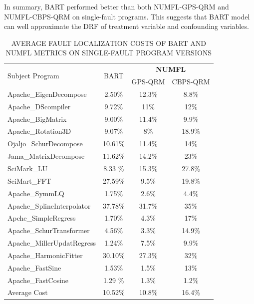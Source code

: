 In summary, BART  performed better than both NUMFL-GPS-QRM and NUMFL-CBPS-QRM on single-fault programs. This suggests that BART model can well approximate the DRF of treatment variable and confounding variables.

\begin{table}[htbp!]
\caption{AVERAGE FAULT LOCALIZATION COSTS OF BART AND NUMFL METRICS ON SINGLE-FAULT PROGRAM VERSIONS}
\label{tableBARTvsNUMFL}
\centering
      \begin{tabular}{|l|c|c|c|}
      \hline
\multirow{2}{*}{Subject Program}	& \multirow{2}{*}{BART}&	\multicolumn{2}{|c|}{{\bf NUMFL}}	\\	\cline{3-4}
& & GPS-QRM	&CBPS-QRM \\ \hline
Apache\_EigenDecompose &	2.50\%&	12.3\%	&	8.8\%	\\	\hline
Apache\_DScompiler&	9.72\%&	11\%	&	12\%	\\	\hline
Apache\_BigMatrix	&	9.00\%&11.4\%	&	9.9\%	\\	\hline
Apache\_Rotation3D&	9.07\%&	8\%	&	18.9\%	\\	\hline
Ojaljo\_SchurDecompose&	10.61\%&	11.4\%	&	14\%	\\	\hline
Jama\_MatrixDecompose	&11.62\%&	14.2\%	&	23\%	\\	\hline
SciMark\_LU&8.33	\%&	15.3\%	&	27.8\%	\\	\hline
SciMart\_FFT&	 27.59\%&	9.5\%	&	19.8\%	\\	\hline
Apache\_SymmLQ&	 1.75\%&	2.6\%	&	4.4\%	\\	\hline
Apache\_SplineInterpolator&	 37.78\%&	31.7\%	&	35\%	\\	\hline
Apche\_SimpleRegress&	 1.70\%&	4.3\%	&	17\%	\\	\hline
Apache\_SchurTransformer&	 4.56\%&	3.3\%	&	14.9\%	\\	\hline
Apache\_MillerUpdatRegress&	 1.24\%&	7.5\%	&	9.9\%	\\	\hline
Apache\_HarmonicFitter&	30.10\%&	27.3\%	&	32\%	\\	\hline
Apache\_FastSine&	1.53\%&	1.5\%	&	13\%	\\	\hline
Apache\_FastCosine	&1.29	\%&1.3\%	&	1.2\%	\\	\hline
Average Cost	&	10.52\%&10.8\%	&	16.4\%	\\	\hline
\end{tabular}
\end{table}

